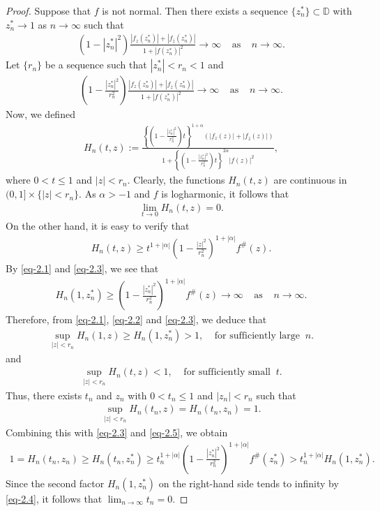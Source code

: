 \documentclass[a4paper,12pt]{amsart}
\theoremstyle{plain}
\theoremstyle{definition}
\begin{document}
\begin{proof}
Suppose that $f$ is not normal. Then there exists a sequence $\{z^*_n\}\subset\mathbb{D}$ with $z^*_n\rightarrow 1$ as $n\rightarrow\infty$ such that 
\begin{align*}
	\left(1-|z^*_n|^2\right)\frac{|f_z(z^*_n)|+|f_{\overline{z}}(z^*_n)|}{1+|f(z^*_n)|^2}\rightarrow\infty \;\;\;\; \mbox{as}\;\;\;\;n\rightarrow\infty.
\end{align*}
Let $\{r_n\}$ be a sequence such that $|z^*_n|<r_n<1$ and
\begin{align}\label{eq-2.1}
	\left(1-\frac{|z^*_n|^2}{r^2_n}\right)\frac{|f_z(z^*_n)|+|f_{\overline{z}}(z^*_n)|}{1+|f(z^*_n)|^2}\rightarrow\infty \;\;\;\; \mbox{as}\;\;\;\;n\rightarrow\infty.
\end{align}
Now, we defined
\begin{align*}
	H_n(t,z):=\frac{\left\{\left(1-\frac{|z^*_n|^2}{r^2_n}\right)t\right\}^{1+\alpha}\left(|f_z(z)|+|f_{\overline{z}}(z)|\right)}{1 + \left\{\left(1-\frac{|z^*_n|^2}{r^2_n}\right)t\right\}^{2\alpha} |f(z)|^2},
\end{align*}
where $0<t\leq 1$ and $|z|<r_n$. Clearly, the functions $H_n(t,z)$ are continuous in $(0,1]\times\{|z|<r_n\}$. As $\alpha>-1$ and $f$ is logharmonic, it follows that
\begin{align}\label{eq-2.2}
	\lim_{t\rightarrow 0} H_n(t,z)=0.
\end{align}
On the other hand, it is easy to verify that
\begin{align}\label{eq-2.3}
	H_n(t,z)\geq t^{1+|\alpha|}\left(1-\frac{|z|^2}{r^2_n} \right)^{1+|\alpha|}  f^{\#}(z).
\end{align}
By \eqref{eq-2.1} and \eqref{eq-2.3}, we see that
\begin{align}\label{eq-2.4}
	H_n(1,z^*_n)\geq \left(1-\frac{|z^*_n|^2}{r^2_n} \right)^{1 +|\alpha|} f^{\#}(z)\rightarrow\infty \;\;\;\;\mbox{as} \;\;\;\;n\rightarrow \infty.
\end{align}
Therefore, from \eqref{eq-2.1}, \eqref{eq-2.2} and \eqref{eq-2.3}, we deduce that
\begin{align*}
	\sup_{|z|<r_n} H_n(1,z)\geq H_n(1,z^*_n)>1,\;\;\;\;\mbox{for sufficiently large} \;\; n.
\end{align*}
and
\begin{align*}
	\sup_{|z|<r_n} H_n(t,z)< 1,\;\;\;\;\mbox{for sufficiently small} \;\; t.
\end{align*}
Thus, there exists $t_n$ and $z_n$ with $0<t_n\leq 1$ and $|z_n|<r_n$ such that
\begin{align}\label{eq-2.5}
	\sup_{|z|<r_n} H_n(t_n,z)= H_n(t_n,z_n)=1.
\end{align}
Combining this with \eqref{eq-2.3} and \eqref{eq-2.5}, we obtain
\begin{align*}
	1=H_n(t_n,z_n)\geq H_n(t_n,z^*_n)\geq t^{1+|\alpha|}_n\left(1- \frac{|z^*_n|^2}{r^2_n}\right)^{1+|\alpha|}  f^{\#}(z^*_n)> t^{1+|\alpha|}_n H_n(1,z^*_n).
\end{align*}
Since the second factor $H_n(1,z^*_n)$ on the right-hand side tends to infinity by \eqref{eq-2.4}, it follows that $\lim_{n\rightarrow\infty} t_n=0$.\vspace{2mm}


\end{proof}
\end{document}
